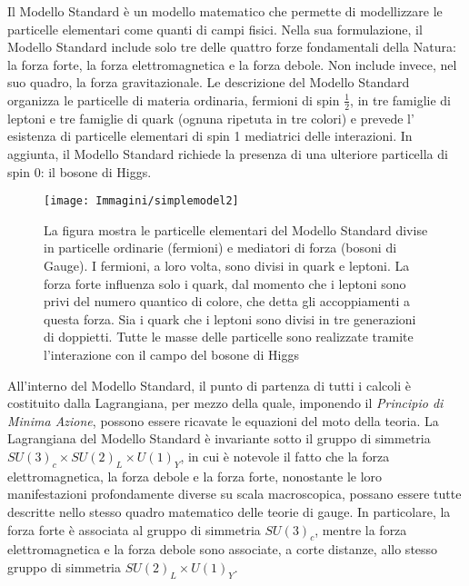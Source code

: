 \medskip
Il Modello Standard è un modello matematico che permette di modellizzare le particelle elementari come quanti di campi fisici.
Nella sua formulazione, il Modello Standard include solo tre delle quattro forze fondamentali della Natura: la forza forte, la
forza elettromagnetica e la forza debole. Non include invece, nel suo quadro, la forza gravitazionale.
\newline
Le descrizione del Modello Standard organizza le particelle di materia ordinaria, fermioni di spin $\frac{1}{2}$, in 
tre famiglie di leptoni e tre famiglie di quark (ognuna ripetuta in tre colori) e prevede l'
esistenza di particelle elementari di spin 1 mediatrici delle interazioni.
In aggiunta, il Modello Standard richiede la presenza di una ulteriore particella di spin $0$:
il bosone di Higgs. %
\begin{figure}[!htbp]
\begin{center}
\texttt{[image: Immagini/simplemodel2]}
\end{center}
\caption[Particelle elementari del Modello Standard]{La figura mostra le particelle elementari del Modello Standard divise 
in particelle ordinarie (fermioni) e mediatori di forza 
(bosoni di Gauge). I fermioni, a loro volta, sono divisi in quark e leptoni. La forza forte influenza solo i quark, dal momento che
i leptoni sono privi del numero quantico di colore, che detta gli accoppiamenti a questa forza. Sia i quark che i leptoni sono divisi in
tre generazioni di doppietti. Tutte le masse delle particelle sono realizzate tramite l'interazione con il campo del bosone di Higgs}
\label{particles}
\end{figure}

All'interno del Modello Standard, il punto di partenza di tutti i calcoli è costituito dalla Lagrangiana, per mezzo
della quale, imponendo il \textit{Principio di Minima Azione}, possono essere ricavate le equazioni del moto della teoria.
\newline
La Lagrangiana del Modello Standard è invariante sotto il gruppo di simmetria $SU(3)_{c}\times SU(2)_{L}\times U(1)_{Y}$, in cui è notevole
il fatto che la forza elettromagnetica, la forza debole e la forza forte, nonostante le loro manifestazioni profondamente diverse su scala
macroscopica, possano essere tutte descritte nello stesso quadro matematico delle teorie di gauge.
\newline
In particolare, la forza forte è associata al gruppo di simmetria 
$SU(3)_{c}$, mentre la forza elettromagnetica e la forza debole sono associate, a corte distanze,
allo stesso gruppo di simmetria $SU(2)_{L}\times U(1)_{Y}$.

